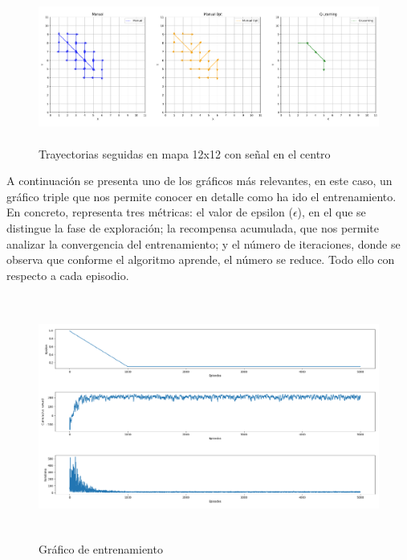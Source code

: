 \begin{figure} [H]
    \begin{center}
    \includegraphics[height=5cm]{imagenes/cap4/13_trayectorias_12.png}
    \end{center}
    \caption[Trayectorias seguidas en mapa 12x12 con señal en el centro]{Trayectorias seguidas en mapa 12x12 con señal en el centro}
    \label{fig:12_traj}
\end{figure}

A continuación se presenta uno de los gráficos más relevantes, en este caso, un gráfico triple que nos permite conocer en detalle como ha ido el entrenamiento. En concreto, representa tres métricas: el valor de epsilon ($\epsilon$), en el que se distingue la fase de exploración; la recompensa acumulada, que nos permite analizar la convergencia del entrenamiento; y el número de iteraciones, donde se observa que conforme el algoritmo aprende, el número se reduce. Todo ello con respecto a cada episodio.\\

\begin{figure} [H]
    \begin{center}
    \includegraphics[height=8cm]{imagenes/cap4/14_training_graph.png}
    \end{center}
    \caption[Gráfico de entrenamiento]{Gráfico de entrenamiento}
    \label{fig:training_graph}
\end{figure}

